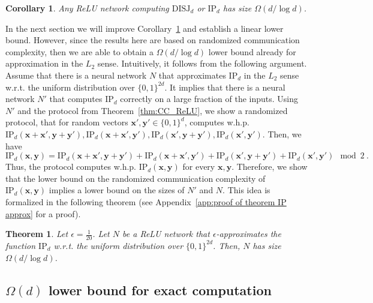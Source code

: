 \documentclass[11pt]{article}
\newtheorem{theorem}{Theorem}[section]
\newtheorem{corollary}{Corollary}[section]
\newcommand{\bx}{\mathbf{x}}
\newcommand{\by}{\mathbf{y}}
\begin{document}
\begin{corollary}
\label{cor:CC_ReLU}
	Any ReLU network computing $\text{DISJ}_d$ or $\text{IP}_d$ has size $\Omega(d/\log d)$.	
\end{corollary}

In the next section we will improve Corollary~\ref{cor:CC_ReLU} and establish a linear lower bound. However, since the results here are based on randomized communication complexity, then we are able to obtain a $\Omega(d/\log d)$ lower bound already for approximation in the $L_2$ sense. 
Intuitively, it follows from the following argument. Assume that there is a neural network $N$ that approximates $\text{IP}_d$ in the $L_2$ sense w.r.t. the uniform distribution over $\{0,1\}^{2d}$. It implies that there is a neural network $N'$ that computes $\text{IP}_d$ correctly on a large fraction of the inputs. %
Using $N'$ and the protocol from Theorem~\ref{thm:CC_ReLU}, we show a randomized protocol, that for random vectors $\bx',\by' \in \{0,1\}^d$, computes w.h.p. $\text{IP}_d(\bx+\bx',\by+\by'), \text{IP}_d(\bx+\bx',\by'), \text{IP}_d(\bx',\by+\by'), \text{IP}_d(\bx',\by')$. Then, we have
\[
	\text{IP}_d(\bx,\by) = \text{IP}_d(\bx+\bx',\by+\by') +  \text{IP}_d(\bx+\bx',\by') + \text{IP}_d(\bx',\by+\by') + \text{IP}_d(\bx',\by') \mod 2~.
\]
Thus, the protocol computes w.h.p. $\text{IP}_d(\bx,\by)$ for every $\bx,\by$. Therefore, we show that the lower bound on the randomized communication complexity of $\text{IP}_d(\bx,\by)$ implies a lower bound on the sizes of $N'$ and $N$.  
This idea is formalized in the following theorem (see Appendix~\ref{app:proof of theorem IP approx} for a proof).

\begin{theorem}
\label{thm:IP approx}
	Let $\epsilon=\frac{1}{20}$.
	Let $N$ be a ReLU network that $\epsilon$-approximates the function $\text{IP}_d$ w.r.t. the uniform distribution over $\{0,1\}^{2d}$. Then, $N$ has size $\Omega(d/\log d)$.
\end{theorem}

\subsection{$\Omega(d)$ lower bound for exact computation} 
\end{document}
